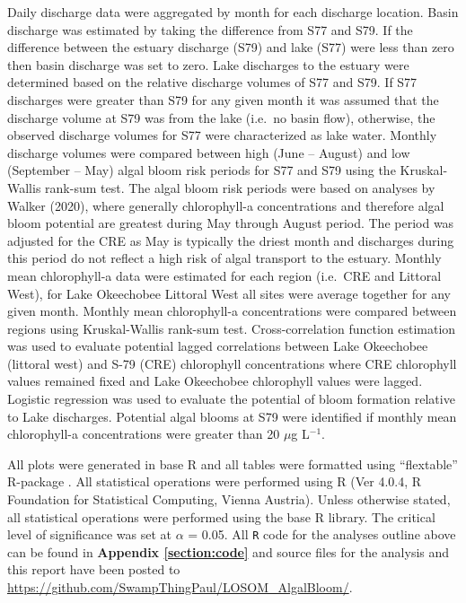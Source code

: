 \documentclass[]{interact}
\theoremstyle{plain}%
\theoremstyle{definition}
\theoremstyle{remark}
\begin{document}
Daily discharge data were aggregated by month for each discharge
location. Basin discharge was estimated by taking the difference from
S77 and S79. If the difference between the estuary discharge (S79) and
lake (S77) were less than zero then basin discharge was set to zero.
Lake discharges to the estuary were determined based on the relative
discharge volumes of S77 and S79. If S77 discharges were greater than
S79 for any given month it was assumed that the discharge volume at S79
was from the lake (i.e.~no basin flow), otherwise, the observed
discharge volumes for S77 were characterized as lake water. Monthly
discharge volumes were compared between high (June -- August) and low
(September -- May) algal bloom risk periods for S77 and S79 using the
Kruskal-Wallis rank-sum test. The algal bloom risk periods were based on
analyses by Walker (2020), where generally chlorophyll-a concentrations
and therefore algal bloom potential are greatest during May through
August period. The period was adjusted for the CRE as May is typically
the driest month and discharges during this period do not reflect a high
risk of algal transport to the estuary. Monthly mean chlorophyll-a data
were estimated for each region (i.e.~CRE and Littoral West), for Lake
Okeechobee Littoral West all sites were average together for any given
month. Monthly mean chlorophyll-a concentrations were compared between
regions using Kruskal-Wallis rank-sum test. Cross-correlation function
estimation was used to evaluate potential lagged correlations between
Lake Okeechobee (littoral west) and S-79 (CRE) chlorophyll
concentrations where CRE chlorophyll values remained fixed and Lake
Okeechobee chlorophyll values were lagged. Logistic regression was used
to evaluate the potential of bloom formation relative to Lake
discharges. Potential algal blooms at S79 were identified if monthly
mean chlorophyll-a concentrations were greater than 20 \(\mu\)g
L\(^{-1}\).

All plots were generated in base R and all tables were formatted using
``flextable'' R-package \citep{gohel_flextable_2021}. All statistical
operations were performed using R (Ver 4.0.4, R Foundation for
Statistical Computing, Vienna Austria). Unless otherwise stated, all
statistical operations were performed using the base R library. The
critical level of significance was set at \(\alpha\) = 0.05. All
\texttt{R} code for the analyses outline above can be found in
\textbf{Appendix \ref{section:code}} and source files for the analysis
and this report have been posted to
\url{https://github.com/SwampThingPaul/LOSOM_AlgalBloom/}.
\end{document}
